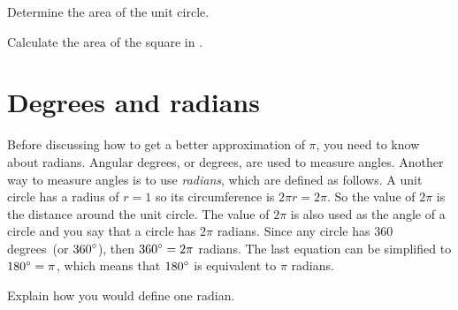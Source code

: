 \documentclass[a4paper,oneside,12pt]{article}
\begin{document}
\begin{exercise}
Determine the area of the unit circle.
\end{exercise}


\begin{exercise}
Calculate the area of the square in
.
\end{exercise}




\section{Degrees and radians}

Before discussing how to get a better approximation of $\pi$, you need
to know about radians.  Angular degrees, or degrees, are used to
measure angles.  Another way to measure angles is to use
\emph{radians}, which are defined as follows.  A unit circle has a
radius of $r = 1$ so its circumference is $2 \pi r = 2 \pi$.  So the
value of $2 \pi$ is the distance around the unit circle.  The value of
$2\pi$ is also used as the angle of a circle and you say that a circle
has $2\pi$ radians.  Since any circle has $360$ degrees~(or
${360}^{\circ}$), then ${360}^{\circ} = 2\pi$ radians.  The last
equation can be simplified to ${180}^{\circ} = \pi$, which means that
${180}^{\circ}$ is equivalent to $\pi$ radians.

\begin{exercise}
Explain how you would define one radian.
\end{exercise}

\end{document}
